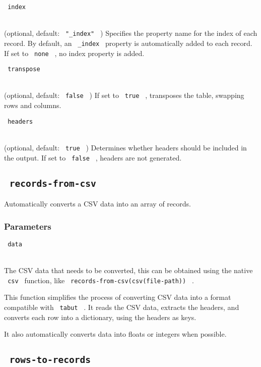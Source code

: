 \texttt{\ index\ }\strut \\
(optional, default: \texttt{\ "\_index"\ } ) Specifies the property name
for the index of each record. By default, an \texttt{\ \_index\ }
property is automatically added to each record. If set to
\texttt{\ none\ } , no index property is added.

\texttt{\ transpose\ }\strut \\
(optional, default: \texttt{\ false\ } ) If set to \texttt{\ true\ } ,
transposes the table, swapping rows and columns.

\texttt{\ headers\ }\strut \\
(optional, default: \texttt{\ true\ } ) Determines whether headers
should be included in the output. If set to \texttt{\ false\ } , headers
are not generated.

\subsection[\texttt{\ records-from-csv\ }
]{\texorpdfstring{\texttt{\ records-from-csv\ }
\protect\hypertarget{records-from-csv}{}{
}}{ records-from-csv   }}\label{records-from-csv}

Automatically converts a CSV data into an array of records.

\begin{Shaded}
\begin{Highlighting}[]
\end{Highlighting}
\end{Shaded}

\subsubsection{Parameters}\label{parameters-2}

\texttt{\ data\ }\strut \\
The CSV data that needs to be converted, this can be obtained using the
native \texttt{\ csv\ } function, like
\texttt{\ records-from-csv(csv(file-path))\ } .

This function simplifies the process of converting CSV data into a
format compatible with \texttt{\ tabut\ } . It reads the CSV data,
extracts the headers, and converts each row into a dictionary, using the
headers as keys.

It also automatically converts data into floats or integers when
possible.

\subsection[\texttt{\ rows-to-records\ }
]{\texorpdfstring{\texttt{\ rows-to-records\ }
\protect\hypertarget{rows-to-records}{}{
}}{ rows-to-records   }}\label{rows-to-records}

